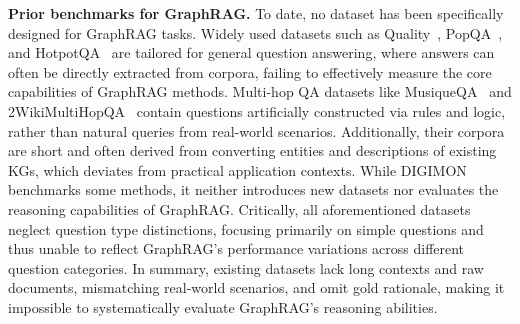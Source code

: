 \documentclass{article}
\begin{document}


\textbf{Prior benchmarks for GraphRAG.} To date, no dataset has been specifically designed for GraphRAG tasks. Widely used datasets such as Quality~\cite{quality}, PopQA~\cite{popqa}, and HotpotQA~\cite{hotpotqa} are tailored for general question answering, where answers can often be directly extracted from corpora, failing to effectively measure the core capabilities of GraphRAG methods. Multi-hop QA datasets like MusiqueQA~\cite{musique} and 2WikiMultiHopQA~\cite{2wikimultihop} contain questions artificially constructed via rules and logic, rather than natural queries from real-world scenarios. Additionally, their corpora are short and often derived from converting entities and descriptions of existing KGs, which deviates from practical application contexts. While DIGIMON~\cite{DIGIMON} benchmarks some methods, it neither introduces new datasets nor evaluates the reasoning capabilities of GraphRAG. Critically, all aforementioned datasets neglect question type distinctions, focusing primarily on simple questions and thus unable to reflect GraphRAG's performance variations across different question categories. In summary, existing datasets lack long contexts and raw documents, mismatching real-world scenarios, and omit gold rationale, making it impossible to systematically evaluate GraphRAG's reasoning abilities.
\end{document}
